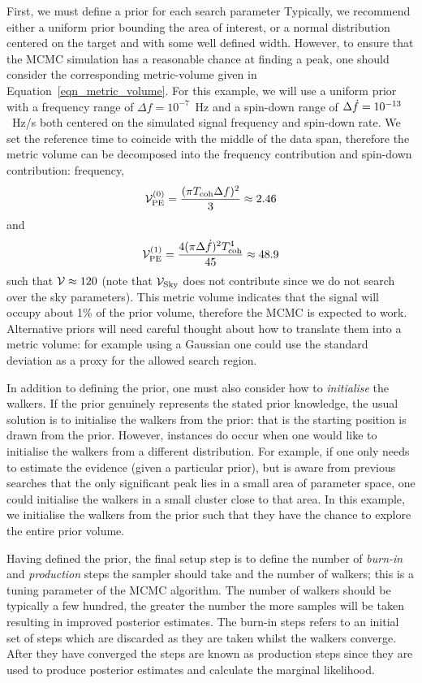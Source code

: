 \documentclass[aps, prd, twocolumn, superscriptaddress, floatfix, showpacs, nofootinbib, longbibliography]{revtex4-1}
\begin{document}
First, we must define a prior for each search parameter Typically, we recommend
either a uniform prior bounding the area of interest, or a normal distribution
centered on the target and with some well defined width. However, to ensure
that the MCMC simulation has a reasonable chance at finding a peak, one should
consider the corresponding metric-volume given in
Equation~\eqref{eqn_metric_volume}. For this example, we will use a uniform
prior with a frequency range of $\Delta f = 10^{-7}$~Hz and a spin-down range
of $\Delta \dot{f}=10^{-13}$~Hz/s both centered on the simulated signal frequency
and spin-down rate. We set the reference time to coincide with the middle of
the data span, therefore the metric volume can be decomposed into the frequency
contribution and spin-down contribution:
frequency,
\begin{align}
\mathcal{V}_{\rm PE}^{(0)} = \frac{(\pi T_{\rm coh}\Delta f)^2}{3} \approx 2.46
\end{align}
and
\begin{align}
\mathcal{V}_{\rm PE}^{(1)} = \frac{4(\pi\Delta \dot{f})^2T_{\rm coh}^{4}}{45} \approx 48.9
\end{align}
such that $\mathcal{V}\approx120$ (note that $\mathcal{V}_{\rm Sky}$ does not contribute since we do
not search over the sky parameters). This metric volume indicates that the
signal will occupy about 1\% of the prior volume, therefore the MCMC is
expected to work. Alternative priors will need careful thought about how to
translate them into a metric volume: for example using a Gaussian one could use
the standard deviation as a proxy for the allowed search region.

In addition to defining the prior, one must also consider how to
\emph{initialise} the walkers. If the prior genuinely represents the stated
prior knowledge, the usual solution is to initialise the walkers from the
prior: that is the starting position is drawn from the prior. However,
instances do occur when one would like to initialise the walkers from a
different distribution. For example, if one only needs to estimate the evidence
(given a particular prior), but is aware from previous searches that the only
significant peak lies in a small area of parameter space, one could initialise
the walkers in a small cluster close to that area. In this example, we
initialise the walkers from the prior such that they have the chance to explore
the entire prior volume.

Having defined the prior, the final setup step is to define the number of
\emph{burn-in} and \emph{production} steps the sampler should take and the
number of walkers; this is a tuning parameter of the MCMC algorithm. The number
of walkers should be typically a few hundred, the greater the number the more
samples will be taken resulting in improved posterior estimates. The burn-in
steps refers to an initial set of steps which are discarded as they are taken
whilst the walkers converge. After they have converged the steps are known as
production steps since they are used to produce posterior estimates and
calculate the marginal likelihood.
\end{document}
